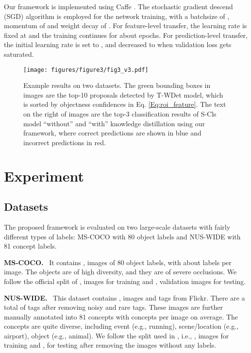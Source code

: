 \documentclass[sigconf,natbib=false]{acmart}
\begin{document}
Our framework is implemented using Caffe \cite{Caffe_mm14_jskl}. The stochastic gradient descend (SGD) algorithm is employed for the network training, with a batchsize of , momentum of  and weight decay of . For feature-level transfer, the learning rate is fixed at  and the training continues for about  epochs. For prediction-level transfer, the initial learning rate is set to , and decreased to  when validation loss gets saturated.
\begin{figure*}[t]
\centerline{\texttt{[image: figures/figure3/fig3\_v3.pdf]}}
\vspace{-5pt}
\caption{\small Example results on two datasets. The green bounding boxes in images are the top-10 proposals detected by T-WDet model, which is sorted by objectness confidences  in Eq. \ref{Eq:roi_feature}. The text on the right of images are the top-3 classification results of S-Cls model ``without'' and ``with'' knowledge distillation using our framework, where correct predictions are shown in \textcolor[rgb]{0.00,0.00,1.00}{blue} and incorrect predictions in \textcolor[rgb]{1.00,0.00,0.00}{red}.}
\label{Fig:results_show}
\vspace{-5pt}
\end{figure*}
\section{Experiment}
\subsection{Datasets}
The proposed framework is evaluated on two large-scale datasets with fairly different types of labels: MS-COCO \cite{coco_eccv14_ty} with 80 object labels and NUS-WIDE \cite{nuswide_cvir09_cjn} with 81 concept labels.

\noindent \textbf{MS-COCO.} \ It contains , images of 80 object labels, with about  labels per image. The objects are of high diversity, and they are of severe occlusions. We follow the official split of , images for training and , validation images for testing.

\noindent \textbf{NUS-WIDE.} \ This dataset contains , images and  tags from Flickr. There are a total of  tags after removing noisy and rare tags. These images are further manually annotated into 81 concepts with  concepts per image on average. The concepts are quite diverse, including event (e.g., running), scene/location (e.g., airport), object (e.g., animal). We follow the split used in \cite{MLIC4_iclr14_YYTAS,MLIC3_cvpr17_FTTWC}, i.e., , images for training and , for testing after removing the images without any labels.
\end{document}
